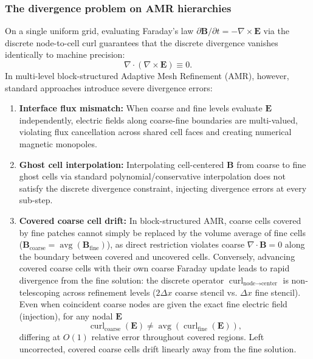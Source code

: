 \documentclass[a4paper, 11pt]{article}
\begin{document}
\subsubsection{The divergence problem on AMR hierarchies}
On a single uniform grid, evaluating Faraday's law $\partial \mathbf{B}/\partial t = -\nabla\times\mathbf{E}$ via the discrete node-to-cell curl guarantees that the discrete divergence vanishes identically to machine precision:
\begin{equation}
\nabla \cdot (\nabla \times \mathbf{E}) \equiv 0.
\end{equation}
In multi-level block-structured Adaptive Mesh Refinement (AMR), however, standard approaches introduce severe divergence errors:
\begin{enumerate}
  \item \textbf{Interface flux mismatch:} When coarse and fine levels evaluate $\mathbf{E}$ independently, electric fields along coarse-fine boundaries are multi-valued, violating flux cancellation across shared cell faces and creating numerical magnetic monopoles.
  \item \textbf{Ghost cell interpolation:} Interpolating cell-centered $\mathbf{B}$ from coarse to fine ghost cells via standard polynomial/conservative interpolation does not satisfy the discrete divergence constraint, injecting divergence errors at every sub-step.
  \item \textbf{Covered coarse cell drift:} In block-structured AMR, coarse cells covered by fine patches cannot simply be replaced by the volume average of fine cells ($\mathbf{B}_{\text{coarse}} = \operatorname{avg}(\mathbf{B}_{\text{fine}})$), as direct restriction violates coarse $\nabla \cdot \mathbf{B} = 0$ along the boundary between covered and uncovered cells.
  Conversely, advancing covered coarse cells with their own coarse Faraday update leads to rapid divergence from the fine solution: the discrete operator $\operatorname{curl}_{\text{node}\to\text{center}}$ is non-telescoping across refinement levels ($2\Delta x$ coarse stencil vs. $\Delta x$ fine stencil). Even when coincident coarse nodes are given the exact fine electric field (injection), for any nodal $\mathbf{E}$
  \begin{equation}
  \operatorname{curl}_{\text{coarse}}(\mathbf{E}) \neq \operatorname{avg}(\operatorname{curl}_{\text{fine}}(\mathbf{E})),
  \end{equation}
  differing at $O(1)$ relative error throughout covered regions. Left uncorrected, covered coarse cells drift linearly away from the fine solution.
\end{enumerate}
\end{document}

